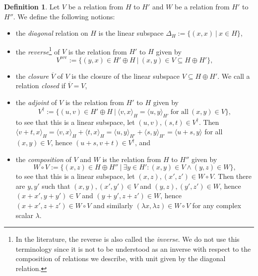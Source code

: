 \documentclass{article}
\newcommand{\rev}{\operatorname{rev}}%
\numberwithin{equation}{section}
\theoremstyle{definition}
\newtheorem{definition}{Definition}[subsection]
\theoremstyle{theorem}
\begin{document}
\begin{definition}\label{Definition: various notions for relations}
    Let $V$ be a relation from $H$ to $H'$ and $W$ be a relation from $H'$ to $H''$. We define the following notions:
    \begin{itemize}
        \item the \emph{diagonal} relation on $H$ is the linear subspace $\Delta_H := \{(x,x) \ | \ x \in H\}$, 
        \item the \emph{reverse}\footnote{In the literature, the reverse is also called the \emph{inverse}. We do not use this terminology since it is not to 
        be understood as an inverse with respect to the composition of relations we describe, with unit given by the diagonal relation.} of 
        $V$ is the relation from $H'$ to $H$ given by
        \begin{equation}
            V^{\rev} := \{(y,x) \in H' \oplus H \ | \ (x,y) \in V \subseteq H \oplus H'\},
        \end{equation}
        \item the \emph{closure} $\overline{V}$ of $V$ is the closure of the linear subspace $V \subseteq H \oplus H'$. 
        We call a relation \emph{closed} if $\overline{V} = V$,
        \item the \emph{adjoint} of $V$ is the relation from $H'$ to $H$ given by 
        \begin{equation}
            V^\dagger := \{(u,v) \in H' \oplus H \ | \ \langle v,x \rangle_{H} = 
            \langle u,y \rangle_{H'} \ \text{for all} \ (x,y) \in V \},
        \end{equation}
        to see that this is a linear subspace, let $(u,v),(s,t) \in V^\dagger$. Then 
        $\langle v+t, x \rangle_H = \langle v,x \rangle_H + \langle t, x \rangle_H = \langle u,y \rangle_{H'} + \langle s,y \rangle_{H'} = \langle u+s,y \rangle$ 
        for all $(x,y) \in V$, hence $(u+s,v+t) \in V^\dagger$, and
        \item the \emph{composition} of $V$ and $W$ is the relation from $H$ to $H''$ given by 
        \begin{equation}
            W \circ V := \{ (x,z) \in H \oplus H'' \ | \ \exists y \in H' : (x,y) \in V \land (y,z) \in W \},
        \end{equation}
        to see that this is a linear subspace, let $(x,z),(x',z') \in W \circ V$. Then there are $y,y'$ such that $(x,y),(x',y') \in V$ and $(y,z),(y',z') \in W$, 
        hence $(x+x',y+y') \in V$ and $(y+y',z+z') \in W$, hence $(x+x',z+z') \in W \circ V$ and similarly $(\lambda x,\lambda z) \in W \circ V$ for any complex 
        scalar $\lambda$. 
    \end{itemize}
\end{definition}
\end{document}
